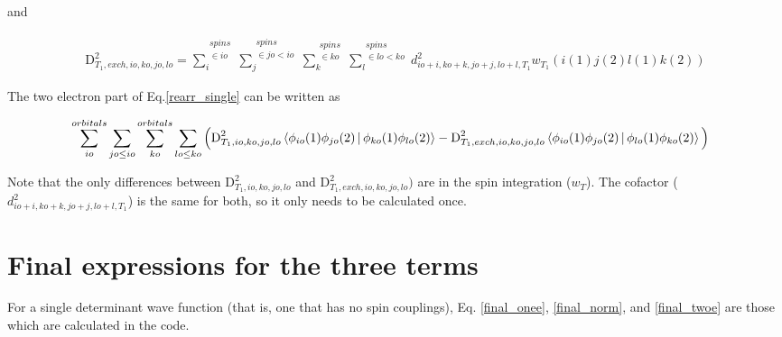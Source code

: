 \documentclass[a4paper]{article}
\begin{document}
     and
      
\begin{equation}
 \begin{aligned}
 	\text{D}_{T_1,exch, io,ko,jo,lo}^2 =                                                                                                                                                                 
       \sum_i^{\substack{spins \\ \in io}}\sum_j^{\substack{spins \\ \in jo<io}}\sum_k^{\substack{spins \\ \in ko}}                                                                                                                                           
   \sum_l^{\substack{spins \\ \in lo<ko}}  d^2_{io+i,ko+k,jo+j,lo+l,T_1} w_{T_1}(i(1) j(2) l(1) k(2))
     \end{aligned}
     \end{equation}

     
The two electron part of Eq.\ref{rearr_single}  can be written as

\begin{equation}
 \begin{aligned}
          & \sum_{io}^{orbitals}\sum_{jo\leq io}\sum_{ko}^{orbitals}\sum_{lo\leq ko}                                                                                                                                                
    \Big( \text{D}_{T_1, io,ko,jo,lo}^2 \Braket{ \phi_{io}(1) \phi_{jo}(2) | \phi_{ko}(1) \phi_{lo}(2) }   -  \text{D}_{T_1,exch, io,ko,jo,lo}^2\Braket{ \phi_{io}(1) \phi_{jo}(2) | \phi_{lo}(1) \phi_{ko}(2) } \Big)
    \label{final_twoe}
    \end{aligned}
     \end{equation}

     
     Note that the only differences between $\text{D}_{T_1, io,ko,jo,lo}^2$ and $\text{D}_{T_1,exch, io,ko,jo,lo}^2)$ are in the spin integration ($w_{T}$).  The cofactor ($d^2_{io+i,ko+k,jo+j,lo+l,T_1}$) is the same for both, so it only needs to be calculated once.


\section{Final expressions for the three terms}

For a single determinant wave function (that is, one that has no spin couplings), Eq. \ref{final_onee}, \ref{final_norm}, and \ref{final_twoe} are those which are calculated in the code.
\end{document}
